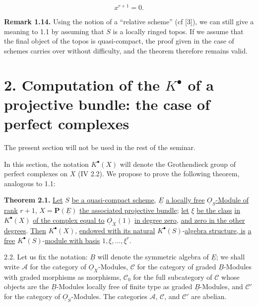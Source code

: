 %
\begin{equation}\tag{1.13.2}
  x^{r+1}=0.
\end{equation}

\textbf{Remark 1.14.} Using the notion of a ``relative scheme'' (cf [3]), we can still give a meaning to 1.1 by assuming that \(S\) is a locally ringed topos. If we assume that the final object of the topos is quasi-compact, the proof given in the case of schemes carries over without difficulty, and the theorem therefore remains valid.

\section*{2. Computation of the \(K^{\bullet}\) of a projective bundle: the case of perfect complexes}

The present section will not be used in the rest of the seminar.

In this section, the notation \(K^{\bullet}(X)\) will denote the Grothendieck group of perfect complexes on \(X\) (IV 2.2). We propose to prove the following theorem, analogous to 1.1:

\textbf{Theorem 2.1.} \uline{Let} \(S\) \uline{be a quasi-compact scheme}, \(\underline{E}\) \uline{a locally free} \(\underline{O}_S\)\uline{-Module of rank} \(r+1\), \(X=\mathbf P(\underline{E})\) \uline{the associated projective bundle}; \uline{let} \(\xi\) \uline{be the class} \uline{in} \(K^{\bullet}(X)\) \uline{of the complex equal to} \(\underline{O}_X(1)\) \uline{in degree zero}, \uline{and zero in the other degrees}. \uline{Then} \(K^{\bullet}(X)\), \uline{endowed with its natural} \(K^{\bullet}(S)\)-\uline{algebra structure, is} \uline{a free} \(K^{\bullet}(S)\)-\uline{module with basis} \(1,\xi,\ldots,\xi^r\).

2.2. Let us fix the notation: \(\underline{B}\) will denote the symmetric algebra of \(\underline{E}\); we shall write \(\mathcal A\) for the category of \(\underline{O}_X\)-Modules, \(\mathcal C\) for the category of graded \(\underline{B}\)-Modules with graded morphisms as morphisms, \(\mathcal C_0\) for the full subcategory of \(\mathcal C\) whose objects are the \(\underline{B}\)-Modules locally free of finite type as graded \(\underline{B}\)-Modules, and \(\mathcal C'\) for the category of \(\underline{O}_S\)-Modules. The categories \(\mathcal A\), \(\mathcal C\), and \(\mathcal C'\) are abelian.

